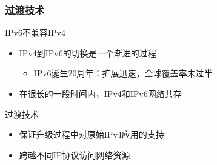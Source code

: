 \documentclass{beamer}
\begin{document}
\begin{frame}
  \frametitle{过渡技术}

  \begin{block}{IPv6不兼容IPv4}
    \begin{itemize}
    \item IPv4到IPv6的切换是一个渐进的过程
      \begin{itemize}
      \item IPv6诞生20周年：扩展迅速，全球覆盖率未过半\footnotemark[1]
      \end{itemize}
    \item 在很长的一段时间内，IPv4和IPv6网络共存
    \end{itemize}
  \end{block}
  \begin{block}{过渡技术}
    \begin{itemize}
    \item 保证升级过程中对原始IPv4应用的支持
    \item 跨越不同IP协议访问网络资源
    \end{itemize}
  \end{block}
\end{frame}
\end{document}
